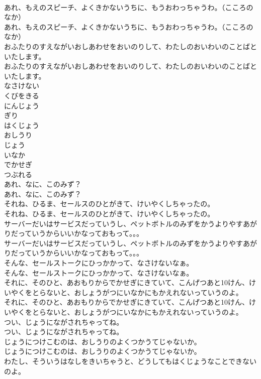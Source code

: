 \documentclass[8pt]{extreport}
\begin{document}
\begin{CJK}{UTF8}{min}
\\	あれ、もえのスピーチ、よくきかないうちに、もうおわっちゃうわ。（こころのなか）
\\	あれ、もえのスピーチ、よくきかないうちに、もうおわっちゃうわ。（こころのなか）
\\	おふたりのすえながいおしあわせをおいのりして、わたしのおいわいのことばといたします。
\\	おふたりのすえながいおしあわせをおいのりして、わたしのおいわいのことばといたします。
\\	なさけない
\\	くびをきる
\\	にんじょう
\\	ぎり
\\	はくじょう
\\	おしうり
\\	じょう
\\	いなか
\\	でかせぎ
\\	つぶれる
\\	あれ、なに、このみず？
\\	あれ、なに、このみず？
\\	それね、ひるま、セールスのひとがきて、けいやくしちゃったの。
\\	それね、ひるま、セールスのひとがきて、けいやくしちゃったの。
\\	サーバーだいはサービスだっていうし、ペットボトルのみずをかうよりやすあがりだっていうからいいかなっておもって。。。
\\	サーバーだいはサービスだっていうし、ペットボトルのみずをかうよりやすあがりだっていうからいいかなっておもって。。。
\\	そんな、セールストークにひっかかって、なさけないなぁ。
\\	そんな、セールストークにひっかかって、なさけないなぁ。
\\	それに、そのひと、あおもりからでかせぎにきていて、こんげつあと10けん、けいやくをとらないと、おしょうがつにいなかにもかえれないっていうのよ。
\\	それに、そのひと、あおもりからでかせぎにきていて、こんげつあと10けん、けいやくをとらないと、おしょうがつにいなかにもかえれないっていうのよ。
\\	つい、じょうにながされちゃってね。
\\	つい、じょうにながされちゃってね。
\\	じょうにつけこむのは、おしうりのよくつかうてじゃないか。
\\	じょうにつけこむのは、おしうりのよくつかうてじゃないか。
\\	わたし、そういうはなしをきいちゃうと、どうしてもはくじょうなことできないのよ。

\end{CJK}
\end{document}
